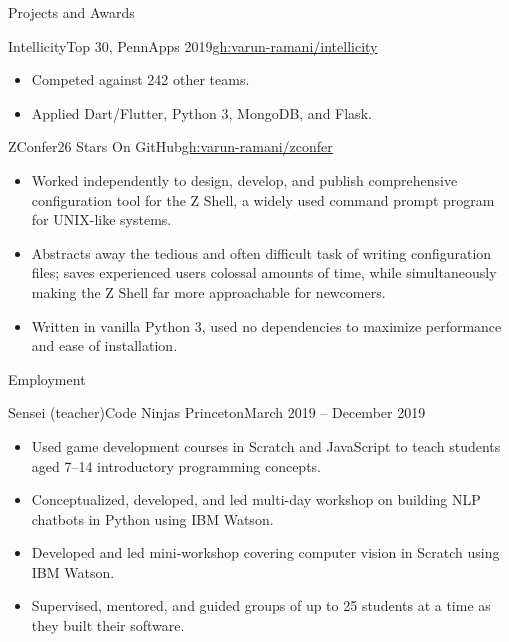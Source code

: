 \documentclass[]{mcdowellcv}
\begin{document}
\begin{cvsection}{Projects and Awards}
\begin{cvsubsection}{Intellicity}{Top 30, PennApps 2019}{\href{https://github.com/varun-ramani/intellicity}{gh:varun-ramani/intellicity}}
\begin{itemize}
				places with absolute confidence, instantly finding anything they need. 
				\item Competed against 242 other teams.
				\item Applied Dart/Flutter, Python 3, MongoDB, and Flask.
			\end{itemize}
		\end{cvsubsection}
		\begin{cvsubsection}{ZConfer}{26 Stars On GitHub}{\href{https://github.com/varun-ramani/zconfer}{gh:varun-ramani/zconfer}}
			\begin{itemize}
				\item Worked independently to design, develop, and publish comprehensive configuration tool
				for the Z Shell, a widely used command prompt program for UNIX-like systems.
				\item Abstracts away the tedious and often difficult task of writing configuration files;
				saves experienced users colossal amounts of time, while simultaneously making the Z Shell far
				more approachable for newcomers.
				\item Written in vanilla Python 3, used no dependencies to maximize performance and ease 
				of installation.
			\end{itemize}
		\end{cvsubsection}
	\end{cvsection}

	\begin{cvsection}{Employment}
		\begin{cvsubsection}{Sensei (teacher)}{Code Ninjas Princeton}{March 2019 -- December 2019}
			\begin{itemize}
				\item Used game development courses in Scratch and JavaScript to 
				teach students aged 7--14 introductory programming concepts.
				\item Conceptualized, developed, and led multi-day workshop on building NLP chatbots in 
				Python using IBM Watson.
				\item Developed and led mini-workshop covering computer vision in Scratch using IBM Watson.
				\item Supervised, mentored, and guided groups of up to 25 students at a time as they 
				built their software.
			\end{itemize}
		\end{cvsubsection}
	\end{cvsection}
\end{document}
